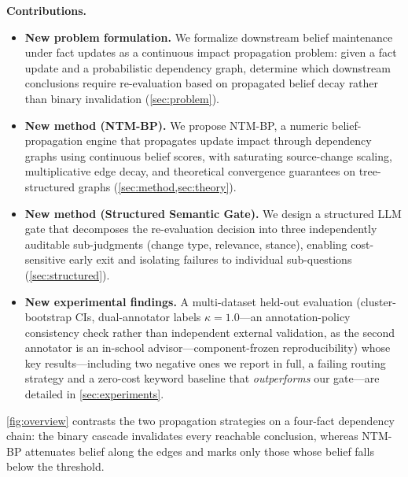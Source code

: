 \documentclass{article}
\theoremstyle{definition}
\begin{document}
\textbf{Contributions.}
\begin{itemize}
\item \textbf{New problem formulation.} We formalize downstream belief
  maintenance under fact updates as a continuous impact propagation
  problem: given a fact update and a probabilistic dependency graph,
  determine which downstream conclusions require re-evaluation based on
  propagated belief decay rather than binary invalidation
  (\cref{sec:problem}).
\item \textbf{New method (NTM-BP).} We propose NTM-BP, a numeric
  belief-propagation engine that propagates update impact through
  dependency graphs using continuous belief scores, with saturating
  source-change scaling, multiplicative edge decay, and theoretical
  convergence guarantees on tree-structured graphs
  (\cref{sec:method,sec:theory}).
\item \textbf{New method (Structured Semantic Gate).} We design a
  structured LLM gate that decomposes the re-evaluation decision into
  three independently auditable sub-judgments (change type, relevance,
  stance), enabling cost-sensitive early exit and isolating failures to
  individual sub-questions (\cref{sec:structured}).
\item \textbf{New experimental findings.} A multi-dataset held-out
  evaluation (cluster-bootstrap CIs, dual-annotator labels
  $\kappa=1.0$---an annotation-policy consistency check rather than
  independent external validation, as the second annotator is an
  in-school advisor---component-frozen reproducibility) whose key
  results---including two negative ones we report in full, a failing
  routing strategy and a zero-cost keyword baseline that
  \emph{outperforms} our gate---are detailed in
  \cref{sec:experiments}.
\end{itemize}

\cref{fig:overview} contrasts the two propagation strategies on a
four-fact dependency chain: the binary cascade invalidates every
reachable conclusion, whereas NTM-BP attenuates belief along the edges
and marks only those whose belief falls below the threshold.
\end{document}
